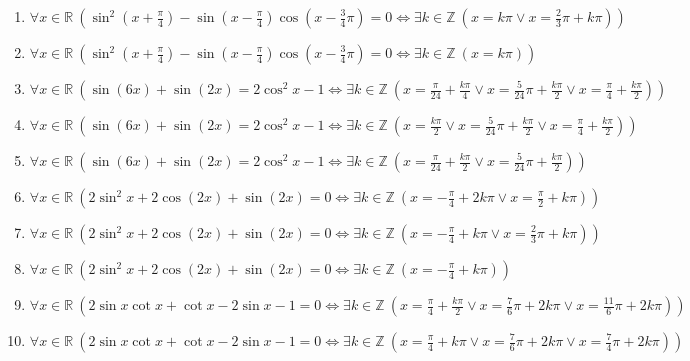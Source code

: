 \documentclass[11pt,a4paper]{article}
\begin{document}
\begin{enumerate}
\item $\displaystyle \forall x \in \mathbb{R}\ \left( \sin^{2}\left(x + \frac{\pi}{4}\right) - \sin\left(x - \frac{\pi}{4}\right)\cos\left(x - \frac{3}{4}\pi\right) = 0 \iff \exists k \in \mathbb{Z}\ \left( x = k\pi \lor x = \frac{2}{3}\pi + k\pi \right) \right)$
\item $\displaystyle \forall x \in \mathbb{R}\ \left( \sin^{2}\left(x + \frac{\pi}{4}\right) - \sin\left(x - \frac{\pi}{4}\right)\cos\left(x - \frac{3}{4}\pi\right) = 0 \iff \exists k \in \mathbb{Z}\ \left( x = k\pi \right) \right)$
\item $\displaystyle \forall x \in \mathbb{R}\ \left( \sin\left(6x\right) + \sin\left(2x\right) = 2\cos^{2} x - 1 \iff \exists k \in \mathbb{Z}\ \left( x = \frac{\pi}{24} + \frac{k\pi}{4} \lor x = \frac{5}{24}\pi + \frac{k\pi}{2} \lor x = \frac{\pi}{4} + \frac{k\pi}{2} \right) \right)$
\item $\displaystyle \forall x \in \mathbb{R}\ \left( \sin\left(6x\right) + \sin\left(2x\right) = 2\cos^{2} x - 1 \iff \exists k \in \mathbb{Z}\ \left( x = \frac{k\pi}{2} \lor x = \frac{5}{24}\pi + \frac{k\pi}{2} \lor x = \frac{\pi}{4} + \frac{k\pi}{2} \right) \right)$
\item $\displaystyle \forall x \in \mathbb{R}\ \left( \sin\left(6x\right) + \sin\left(2x\right) = 2\cos^{2} x - 1 \iff \exists k \in \mathbb{Z}\ \left( x = \frac{\pi}{24} + \frac{k\pi}{2} \lor x = \frac{5}{24}\pi + \frac{k\pi}{2} \right) \right)$
\item $\displaystyle \forall x \in \mathbb{R}\ \left( 2\sin^{2} x + 2\cos\left(2x\right) + \sin\left(2x\right) = 0 \iff \exists k \in \mathbb{Z}\ \left( x = -\frac{\pi}{4} + 2k\pi \lor x = \frac{\pi}{2} + k\pi \right) \right)$
\item $\displaystyle \forall x \in \mathbb{R}\ \left( 2\sin^{2} x + 2\cos\left(2x\right) + \sin\left(2x\right) = 0 \iff \exists k \in \mathbb{Z}\ \left( x = -\frac{\pi}{4} + k\pi \lor x = \frac{2}{3}\pi + k\pi \right) \right)$
\item $\displaystyle \forall x \in \mathbb{R}\ \left( 2\sin^{2} x + 2\cos\left(2x\right) + \sin\left(2x\right) = 0 \iff \exists k \in \mathbb{Z}\ \left( x = -\frac{\pi}{4} + k\pi \right) \right)$
\item $\displaystyle \forall x \in \mathbb{R}\ \left( 2\sin x \cot x + \cot x - 2\sin x - 1 = 0 \iff \exists k \in \mathbb{Z}\ \left( x = \frac{\pi}{4} + \frac{k\pi}{2} \lor x = \frac{7}{6}\pi + 2k\pi \lor x = \frac{11}{6}\pi + 2k\pi \right) \right)$
\item $\displaystyle \forall x \in \mathbb{R}\ \left( 2\sin x \cot x + \cot x - 2\sin x - 1 = 0 \iff \exists k \in \mathbb{Z}\ \left( x = \frac{\pi}{4} + k\pi \lor x = \frac{7}{6}\pi + 2k\pi \lor x = \frac{7}{4}\pi + 2k\pi \right) \right)$

\end{enumerate}
\end{document}
